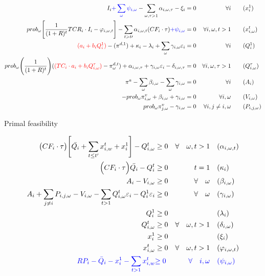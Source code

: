 \documentclass[11pt, letterpaper]{article}
\begin{document}
\begin{align}
    I_i {\color{blue} + \sum_{\omega}\psi_{i,\omega}} -\sum_{\omega,\tau>1} \alpha_{i,\omega,\tau} -\xi_i & = 0 & \forall i {\color{blue}}&  \qquad (x^{1}_{i})\\
    prob_\omega \Bigg[\frac{1}{(1+R)^t}TCR_i \cdot I_i -  \varphi_{i,\omega,t}\Bigg] - \sum_{t> t\prime}\alpha_{i,\omega,t} ( CF_i \cdot \tau) {\color{blue} + \psi_{i,\omega}}& = 0 & \forall i, \omega, t> 1  &  \qquad (x^{t}_{i,\omega})\\
    {\color{red}(a_{i}+b_iQ^{1}_{i})}-(\pi^{d,1}) + \kappa_i - \lambda_{i} + \sum_{\omega} \gamma_{i,\omega}\varepsilon_i & = 0 & \forall i  &  \qquad (Q^{1}_{i})\\
    prob_\omega \Bigg( \frac{1}{(1+R)^t}\Bigg) ( {\color{red}(TC_i \cdot a_{i}+b_iQ_{i,\omega}^{\tau})}-\pi^{d,t}_{\omega}) + \alpha_{i,\omega,\tau} + \gamma_{i,\omega} \varepsilon_{i}-\delta_{i,\omega,\tau} & =0 & \forall i, \omega, \tau>1 &  \qquad (Q_{i,\omega}^{\tau})\\
    \pi^{a} - \sum_{\omega}\beta_{i,\omega} - \sum_{\omega}\gamma_{i,\omega} & =0 & \forall i & \qquad (A_{i}) \\
    -prob_\omega \pi^v_{i,\omega} + \beta_{i,\omega}  + \gamma_{i,\omega} & =0 & \forall i, \omega & \qquad (V_{i,\omega}) \\
    prob_\omega \pi^v_{j,\omega} -\gamma_{i,\omega} & = 0 & \forall i, j \neq i ,\omega & \qquad (P_{i,j,\omega})
\end{align}

\smallskip


\begin{flushleft}
Primal feasibility
\end{flushleft}

\begin{align}
\big(CF_i \cdot \tau \big) \Bigg[\bar{Q_i} + \sum_{t\leq t^{\prime}} x^{t}_{i,w} + x_i^{1} \Bigg] - Q_{i,\omega}^{t} & \geq 0  & \forall  \quad \omega, t  > 1 & \quad (\alpha_{i,\omega,t}) \\
    \Big(CF_i\cdot\tau \Big)\bar{Q_i}-Q_{i}^{t} & \geq 0  &  \quad t  =1 & \quad (\kappa_i) \\
 A_{i} -V_{i,\omega} & \geq  0  & \forall  \quad \omega & \quad (\beta_{i,\omega})\\
 A_{i} + \sum_{j \neq i}P_{i,j,\omega} - V_{i,\omega}-\sum_{t>1}Q_{i,\omega}^{t}\varepsilon_{i}-Q_i^{1}\varepsilon_{i} & \geq  0  &\forall \quad \omega & \quad (\gamma_{i,\omega})\\
 Q_i^{1} & \geq  0 & \quad & \quad (\lambda_i)\\
 Q_{i, \omega}^{t} & \geq  0   & \forall  \quad \omega, t >1 & \quad (\delta_{i,\omega})\\
  x_i^{1} & \geq  0 & \quad & \quad (\xi_i)\\
  x_{i, \omega}^{t} & \geq  0   & \forall  \quad \omega, t >1 & \quad (\varphi_{i,\omega,t})\\
  {\color{blue} RP_i - \bar{Q}_i - x^{1}_i - \sum_{t>1} x^{t}_{i,w} } & {\color{blue} \geq 0} & {\color{blue} \forall \quad i,\omega }&  {\color{blue} \quad (\psi_{i,\omega}) }
\end{align}
\end{document}
